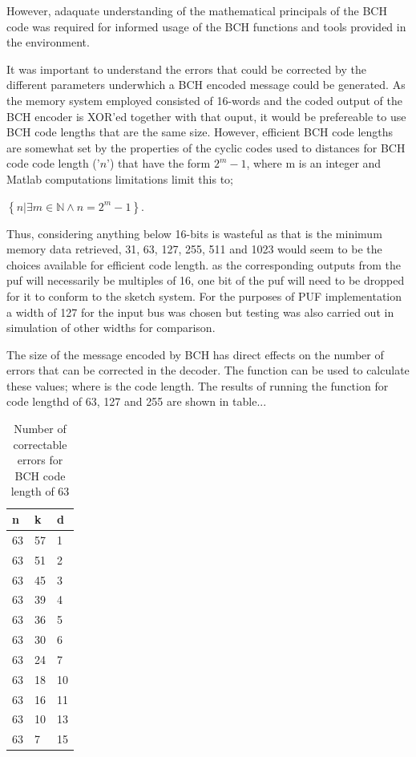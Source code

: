 However, adaquate understanding of the mathematical principals of the BCH code was required for informed usage of the BCH functions and tools provided in the \matlab environment.

It was important to understand the errors that could be corrected by the different
parameters underwhich a BCH encoded message could be generated. As the memory system
employed consisted of 16-words and the coded output of the BCH encoder is XOR'ed
together with that ouput, it would be prefereable to use BCH code lengths that are
the same size.
However, efficient BCH code lengths are somewhat set by the properties of the cyclic
codes used to distances for BCH code code length ('$n$') that have the form $2^{m}-1$,
where m is an integer and Matlab computations limitations limit this to;

$ \left\{ n | \exists m \in \mathbb{N} \wedge n = 2^{m} -1  \right\} $.

Thus, considering anything below 16-bits is wasteful as that is the minimum
memory data retrieved, 31, 63, 127, 255, 511 and 1023 would seem to be the
choices available for efficient code length. as the corresponding outputs
from the \gls{puf} will necessarily be multiples of 16, one bit of the puf
will need to be dropped for it to conform to the sketch system. For the
purposes of PUF implementation a width of 127 for the input bus was chosen
but testing was also carried out in simulation of other widths for comparison.

The size of the message encoded by BCH has direct effects on the number
of errors that can be corrected in the decoder. The \matlab function 
  can be used to calculate these values;
 where  is the code length. The results of running the
 function for code lengthd of 63, 127 and 255 are shown in table...


\begin{table}
\begin{tabular}{lll}
\hline
 n  &   k &   d \\ \hline
 63 &  57 &   1 \\
 63 &  51 &   2 \\
 63 &  45 &   3 \\
 63 &  39 &   4 \\
 63 &  36 &   5 \\
 63 &  30 &   6 \\
 63 &  24 &   7 \\
 63 &  18 &  10 \\
 63 &  16 &  11 \\
 63 &  10 &  13 \\
 63 &   7 &  15
\end{tabular}
\caption{Number of correctable errors for BCH code length of 63}
\end{table}

